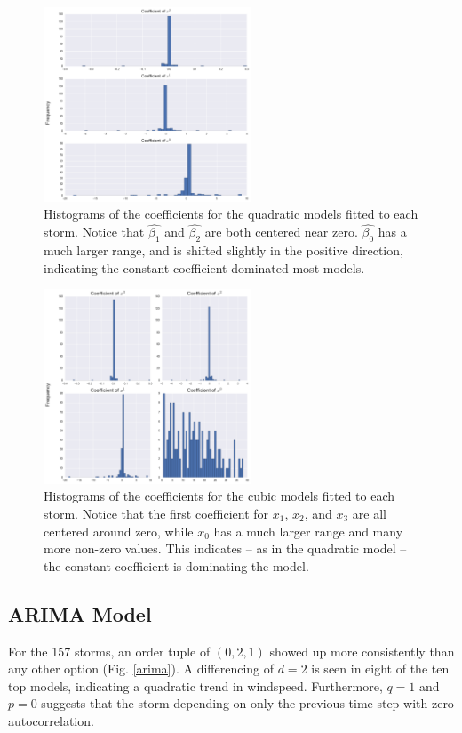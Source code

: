 \documentclass{article}
\begin{document}
	\begin{figure}[H]
			\centering
			\includegraphics[width=0.55\textwidth]{images/quadratic.png}
		\caption{Histograms of the coefficients for the quadratic models fitted to each storm. Notice that $\hat{\beta_1}$ and $\hat{\beta_2}$ are both centered near zero. $\hat{\beta_0}$ has a much larger range, and is shifted slightly in the positive direction, indicating the constant coefficient dominated most models.}
		\label{quadratic}
	\end{figure}
	
	\begin{figure}[H]
			\centering
			\includegraphics[width=0.55\textwidth]{images/cubic.png}
		\caption{Histograms of the coefficients for the cubic models fitted to each storm. Notice that the first coefficient for $x_1$, $x_2$, and $x_3$ are all centered around zero, while $x_0$ has a much larger range and many more non-zero values. This indicates -- as in the quadratic model -- the constant coefficient is dominating the model.}
		\label{cubic}
	\end{figure}

	\subsection{ARIMA Model}
	For the 157 storms, an order tuple of $(0,2,1)$ showed up more consistently than any other option (Fig. \ref{arima}). A differencing of $d=2$ is seen in eight of the ten top models, indicating a quadratic trend in windspeed. Furthermore, $q=1$ and $p=0$ suggests that the storm depending on only the previous time step with zero autocorrelation.
	
\end{document}
